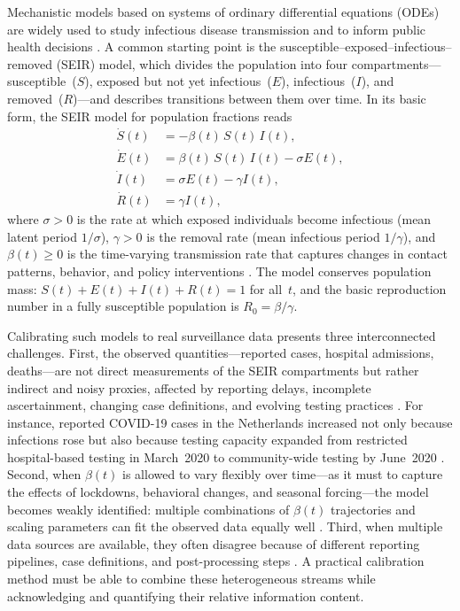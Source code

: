 \documentclass[11pt]{article}
\begin{document}
Mechanistic models based on systems of ordinary differential equations (ODEs) are widely used to study infectious disease transmission and to inform public health decisions \citep{Anderson1991,Keeling2008,Hethcote2000}. A common starting point is the susceptible--exposed--infectious--removed (SEIR) model, which divides the population into four compartments---susceptible~($S$), exposed but not yet infectious~($E$), infectious~($I$), and removed~($R$)---and describes transitions between them over time. In its basic form, the SEIR model for population fractions reads
\begin{align}
  \dot{S}(t) &= -\beta(t)\,S(t)\,I(t), \label{eq:seir-S} \\
  \dot{E}(t) &= \beta(t)\,S(t)\,I(t) - \sigma E(t), \label{eq:seir-E} \\
  \dot{I}(t) &= \sigma E(t) - \gamma I(t), \label{eq:seir-I} \\
  \dot{R}(t) &= \gamma I(t), \label{eq:seir-R}
\end{align}
where $\sigma>0$ is the rate at which exposed individuals become infectious (mean latent period $1/\sigma$), $\gamma>0$ is the removal rate (mean infectious period $1/\gamma$), and $\beta(t)\geq 0$ is the time-varying transmission rate that captures changes in contact patterns, behavior, and policy interventions \citep{Keeling2008,Anderson1991,Flaxman2020}. The model conserves population mass: $S(t)+E(t)+I(t)+R(t)=1$ for all~$t$, and the basic reproduction number in a fully susceptible population is $R_0=\beta/\gamma$.

Calibrating such models to real surveillance data presents three interconnected challenges. First, the observed quantities---reported cases, hospital admissions, deaths---are not direct measurements of the SEIR compartments but rather indirect and noisy proxies, affected by reporting delays, incomplete ascertainment, changing case definitions, and evolving testing practices \citep{McGough2020,Gostic2020}. For instance, reported COVID-19 cases in the Netherlands increased not only because infections rose but also because testing capacity expanded from restricted hospital-based testing in March~2020 to community-wide testing by June~2020 \citep{Geubbels2023}. Second, when $\beta(t)$ is allowed to vary flexibly over time---as it must to capture the effects of lockdowns, behavioral changes, and seasonal forcing---the model becomes weakly identified: multiple combinations of $\beta(t)$ trajectories and scaling parameters can fit the observed data equally well \citep{Ramsay2007,QiZhao2010}. Third, when multiple data sources are available, they often disagree because of different reporting pipelines, case definitions, and post-processing steps \citep{McGough2020,Gostic2020}. A practical calibration method must be able to combine these heterogeneous streams while acknowledging and quantifying their relative information content.
\end{document}
